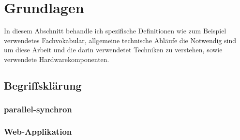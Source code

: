 \chapter{Grundlagen}
In diesem Abschnitt behandle ich spezifische Definitionen wie zum Beispiel verwendetes Fachvokabular, allgemeine technische Abläufe die Notwendig sind um diese Arbeit und die darin verwendetet Techniken zu verstehen, sowie verwendete Hardwarekomponenten.

	\section{Begriffsklärung}	
		\subsection{parallel-synchron}
		\subsection{Web-Applikation}
